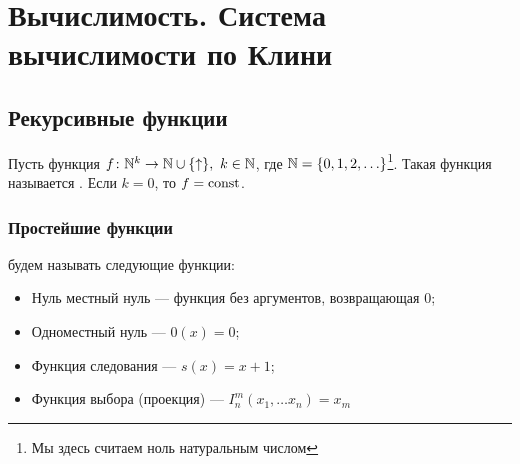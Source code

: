 \chapter{Вычислимость. Система вычислимости по Клини} 
\section{Рекурсивные функции}

\begin{defn}[]
	Пусть функция $ f\colon \mathbb{N}^{k} \to  \mathbb{N} \cup \{\uparrow\}, ~ k \in \mathbb{N}$, где $ \mathbb{N} = \{0, 1, 2, \ldots \}$\footnote{Мы здесь считаем ноль натуральным числом}. Такая функция называется . Если $ k = 0$, то $ f = \textmd{const}$.
\end{defn}

\subsection{Простейшие функции} 
 будем называть следующие функции:
\begin{itemize}
	\item Нуль местный нуль --- функция без аргументов, возвращающая $ 0$;
	\item Одноместный нуль --- $ 0(x) = 0$;
	\item Функция следования --- $ s(x) = x + 1$;
	\item Функция выбора (проекция) ---  $ I_{n}^{m}(x_1, \ldots x_{n}) = x_m$
\end{itemize}


